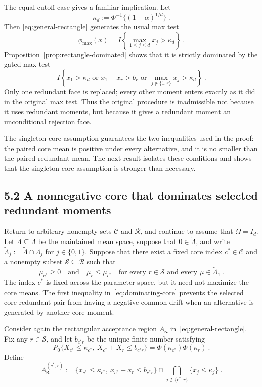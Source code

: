 \documentclass[12pt]{article}
\theoremstyle{remark}
\begin{document}
The equal-cutoff case gives a familiar implication.  Let
\[
\kappa_d:=\Phi^{-1}\{(1-\alpha)^{1/d}\}~.
\]
Then \eqref{eq:general-rectangle} generates the usual max test
\[
\phi_{\max}(x)
=
I\left\{\max_{1\le j\le d}x_j>\kappa_d\right\}~.
\]
Proposition~\ref{prop:rectangle-dominated} shows that it is strictly dominated
by the gated max test
\[
I\left\{
x_1>\kappa_d
\text{ or }
x_1+x_r>b_r
\text{ or }
\max_{j\notin\{1,r\}}x_j>\kappa_d
\right\}~.
\]
Only one redundant face is replaced; every other moment enters exactly as it
did in the original max test.  Thus the original procedure is inadmissible not
because it uses redundant moments, but because it gives a redundant moment an
unconditional rejection face.

The singleton-core assumption guarantees the two inequalities used in the
proof: the paired core mean is positive under every alternative, and it is no
smaller than the paired redundant mean.  The next result isolates these
conditions and shows that the singleton-core assumption is stronger than
necessary.

\subsection*{5.2 A nonnegative core that dominates selected redundant moments}

Return to arbitrary nonempty sets $\mathcal C$ and $\mathcal R$, and continue
to assume that $\Omega=I_d$.  Let $\widetilde\Lambda\subseteq\Lambda$ be the
maintained mean space, suppose that $0\in\widetilde\Lambda$, and write
$\widetilde\Lambda_j:=\widetilde\Lambda\cap\Lambda_j$ for $j\in\{0,1\}$.
Suppose that there exist a fixed core index $c^*\in\mathcal C$ and a nonempty
subset $\mathcal S\subseteq\mathcal R$ such that
\begin{equation}\label{eq:dominating-core}
\mu_{c^*}\ge0
\quad\text{and}\quad
\mu_r\le\mu_{c^*}
\quad\text{for every }r\in\mathcal S
\text{ and every }\mu\in\widetilde\Lambda_1~.
\end{equation}
The index $c^*$ is fixed across the parameter space, but it need not maximize
the core means.  The first inequality in~\eqref{eq:dominating-core} prevents
the selected core-redundant pair from having a negative common drift when an
alternative is generated by another core moment.

Consider again the rectangular acceptance region
$A_{\bm\kappa}$ in~\eqref{eq:general-rectangle}.  Fix any $r\in\mathcal S$,
and let $b_{c^*r}$ be the unique finite number satisfying
\begin{equation}\label{eq:general-gate-calibration}
P_0\{X_{c^*}\le\kappa_{c^*},\
      X_{c^*}+X_r\le b_{c^*r}\}
=
\Phi(\kappa_{c^*})\Phi(\kappa_r)~.
\end{equation}
Define
\begin{equation}\label{eq:general-gated-rectangle}
A_{\bm\kappa}^{(c^*,r)}
:=
\{x_{c^*}\le\kappa_{c^*},\
  x_{c^*}+x_r\le b_{c^*r}\}
\cap
\bigcap_{j\notin\{c^*,r\}}\{x_j\le\kappa_j\}~.
\end{equation}
\end{document}
